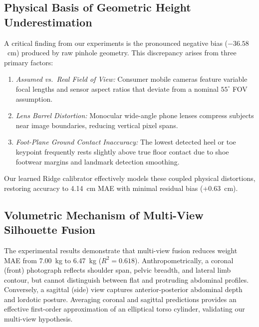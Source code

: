 \documentclass[conference]{IEEEtran}
\begin{document}
\subsection{Physical Basis of Geometric Height Underestimation}
A critical finding from our experiments is the pronounced negative bias ($-36.58$~cm) produced by raw pinhole geometry. This discrepancy arises from three primary factors:
\begin{enumerate}
    \item \textit{Assumed vs.~Real Field of View:} Consumer mobile cameras feature variable focal lengths and sensor aspect ratios that deviate from a nominal $55^\circ$ FOV assumption.
    \item \textit{Lens Barrel Distortion:} Monocular wide-angle phone lenses compress subjects near image boundaries, reducing vertical pixel spans.
    \item \textit{Foot-Plane Ground Contact Inaccuracy:} The lowest detected heel or toe keypoint frequently rests slightly above true floor contact due to shoe footwear margins and landmark detection smoothing.
\end{enumerate}
Our learned Ridge calibrator effectively models these coupled physical distortions, restoring accuracy to 4.14~cm MAE with minimal residual bias ($+0.63$~cm).

\subsection{Volumetric Mechanism of Multi-View Silhouette Fusion}
The experimental results demonstrate that multi-view fusion reduces weight MAE from 7.00~kg to 6.47~kg ($R^2=0.618$). Anthropometrically, a coronal (front) photograph reflects shoulder span, pelvic breadth, and lateral limb contour, but cannot distinguish between flat and protruding abdominal profiles. Conversely, a sagittal (side) view captures anterior-posterior abdominal depth and lordotic posture. Averaging coronal and sagittal predictions provides an effective first-order approximation of an elliptical torso cylinder, validating our multi-view hypothesis.
\end{document}
